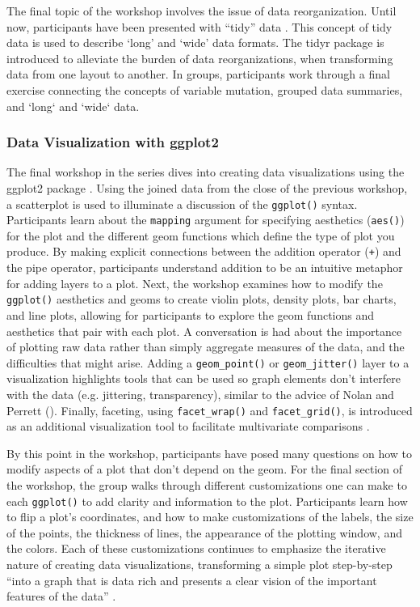 \documentclass[12pt]{article}
\begin{document}
\quad The final topic of the workshop involves the issue of data reorganization.
Until now, participants have been presented with ``tidy'' data \citep{tidy}. 
This concept of tidy data is used to describe `long' and `wide' data
formats. The tidyr package \citep{tidyr} is introduced to alleviate the
burden of data reorganizations, when transforming data from one layout to
another. In groups, participants work through a final exercise connecting the
concepts of variable mutation, grouped data summaries, and `long` and `wide` 
data. 

\subsubsection{Data Visualization with ggplot2}
\label{sec:vizual} 

\noindent The final workshop in the series dives into creating data
visualizations using the ggplot2 package \citep{ggplot}. Using the joined data
from the close of the previous workshop, a scatterplot is used to
illuminate a discussion of the \texttt{ggplot()} syntax. Participants learn
about the \texttt{mapping} argument for specifying aesthetics (\texttt{aes()}) 
for the plot and the different geom functions which define the type of plot you
produce. By making explicit connections between the addition operator 
(\texttt{+}) and the pipe operator, participants understand addition to be an
intuitive metaphor for adding layers to a plot. Next, the workshop examines how
to modify the \texttt{ggplot()} aesthetics and geoms to create violin plots,
density plots, bar charts, and line plots, allowing for participants to explore
the geom functions and aesthetics that pair with each plot. A conversation
is had about the importance of plotting raw data rather than simply aggregate
measures of the data, and the difficulties that might arise. Adding a
\texttt{geom\_point()} or \texttt{geom\_jitter()} layer to a visualization
highlights tools that can be used so graph elements don't interfere with the
data (e.g. jittering, transparency), similar to the advice of Nolan and Perrett
(\citeyear{nolan-viz}). Finally, faceting, using \texttt{facet\_wrap()} and
\texttt{facet\_grid()}, is introduced as an additional visualization tool to
facilitate multivariate comparisons \citep[p.\ 261]{nolan-viz}. 

\quad By this point in the workshop, participants have posed many questions on
how to modify aspects of a plot that don't depend on the geom. For the final 
section of the workshop, the group walks through different customizations one 
can make to each \texttt{ggplot()} to add clarity and information to the 
plot. Participants learn how to flip a plot's coordinates, and how to make
customizations of the labels, the size of the points, the thickness of
lines, the appearance of the plotting window, and the colors. Each of
these customizations continues to emphasize the iterative nature 
of creating data visualizations, transforming a simple plot step-by-step ``into
a graph that is data rich and presents a clear vision of the important features
of the data'' \citep[p.\ 262]{nolan-viz}.
\end{document}
